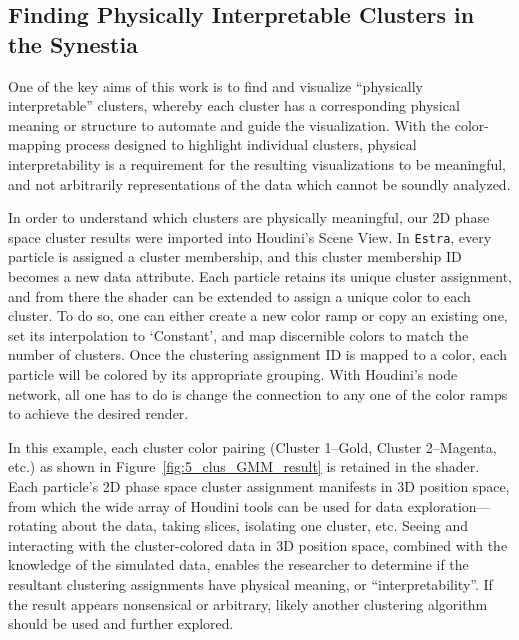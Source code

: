 \documentclass[fleqn,usenatbib,useAMS]{mnras}
\begin{document}

\subsection{Finding Physically Interpretable Clusters in the Synestia}

One of the key aims of this work is to find and visualize ``physically interpretable'' clusters, whereby each cluster has a corresponding physical meaning or structure to automate and guide the visualization. With the color-mapping process designed to highlight individual clusters, physical interpretability is a requirement for the resulting visualizations to be meaningful, and not arbitrarily representations of the data which cannot be soundly analyzed. \par

In order to understand which clusters are physically meaningful, our 2D phase space cluster results were imported into Houdini's Scene View. In \texttt{Estra}, every particle is assigned a cluster membership, and this cluster membership ID becomes a new data attribute. Each particle retains its unique cluster assignment, and from there the shader can be extended to assign a unique color to each cluster. To do so, one can either create a new color ramp or copy an existing one, set its interpolation to `Constant', and map discernible colors to match the number of clusters. Once the clustering assignment ID is mapped to a color, each particle will be colored by its appropriate grouping. With Houdini's node network, all one has to do is change the connection to any one of the color ramps to achieve the desired render. \par

In this example, each cluster color pairing (Cluster 1--Gold, Cluster 2--Magenta, etc.) as shown in Figure~\ref{fig:5_clus_GMM_result} is retained in the shader. Each particle's 2D phase space cluster assignment manifests in 3D position space, from which the wide array of Houdini tools can be used for data exploration---rotating about the data, taking slices, isolating one cluster, etc. Seeing and interacting with the cluster-colored data in 3D position space, combined with the knowledge of the simulated data, enables the researcher to determine if the resultant clustering assignments have physical meaning, or ``interpretability''. If the result appears nonsensical or arbitrary, likely another clustering algorithm should be used and further explored. \par
\end{document}

